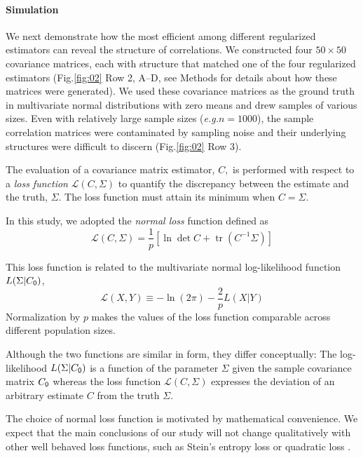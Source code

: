 \documentclass[10pt]{article}
\DeclareMathOperator{\Tr}{tr}
\newcommand{\figref}[2]{Fig.\;\ref{fig:#1}\,#2}
\newcommand{\loss}[1]{\mathcal L\left(#1\right)}
\newcommand{\eg}{\emph{e.g.}\;}
\begin{document}
\paragraph{Simulation}
We next demonstrate how the most efficient among different regularized estimators can reveal the structure of correlations.
We constructed four $50\times 50$ covariance matrices, each with structure that matched one of the four regularized estimators (\figref{02}{\,Row 2, A--D}, see Methods for details about how these matrices were generated).  We used these covariance matrices as the ground truth in multivariate normal distributions with zero means and drew samples of various sizes. Even with relatively large sample sizes (\eg $n=1000$), the sample correlation matrices were contaminated by sampling noise and their underlying structures were difficult to discern (\figref{02}{\,Row 3}). 

The evaluation of a covariance matrix estimator, $C,$ is performed with respect to a \emph{loss function} $\loss{C,\Sigma}$ to quantify the discrepancy between the estimate and the truth, $\Sigma$.  The loss function must attain its minimum when $C=\Sigma$.

In this study, we adopted the \emph{normal loss} function defined as
\begin{equation}\label{eq:loss}
    \loss{C,\Sigma} = \frac 1 p\left[\ln \det C + \Tr(C^{-1}\Sigma)\right]
\end{equation}

This loss function is related to the multivariate normal log-likelihood function $L(\Sigma|C_{\sf 0})$,
\begin{equation}
     \loss{X,Y} \equiv -\ln(2\pi) - \frac 2 p L(X|Y)
\end{equation}
Normalization by $p$ makes the values of the loss function comparable across different population sizes. 

Although the two functions are similar in form, they differ conceptually: The log-likelihood $L(\Sigma|C_{\sf 0})$ is a function of the parameter $\Sigma$ given the sample covariance matrix $C_{\sf 0}$ whereas the loss function $\loss{C,\Sigma}$ expresses the deviation of an arbitrary estimate $C$ from the truth $\Sigma$.

The choice of normal loss function is motivated by mathematical convenience. We expect that the main conclusions of our study will not change qualitatively with other well behaved loss functions, such as Stein's entropy loss or quadratic loss \cite{James:1961, Fan:2008, Ledoit:2004, Schafer:2005}.  
\end{document}
